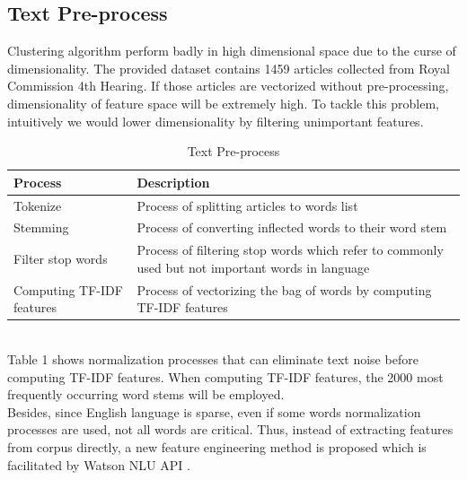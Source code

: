 \documentclass[12pt]{article}
\begin{document}
\subsection{Text Pre-process}
Clustering algorithm perform badly in high dimensional space due to the curse of dimensionality. The provided dataset contains 1459 articles collected from Royal Commission 4th Hearing. If those articles are vectorized without pre-processing, dimensionality of feature space will be extremely high. To tackle this problem, intuitively we would lower dimensionality by filtering unimportant features. 
\begin{table}[h]
\centering
    \begin{tabular}{ | p{4cm}<{\centering} | p{8cm}<{\centering}|}
    \hline
    \textbf{Process}           & \textbf{Description}                                                                             \\ \hline  
    Tokenize          & Process of splitting  articles to words list                                                     \\ \hline  
    Stemming          & Process of converting inflected words to their word stem                                         \\  \hline  
    Filter stop words & Process of filtering stop words which refer to commonly used but not important words in language \\   \hline  
    Computing TF-IDF features  & Process of vectorizing the bag of words by computing TF-IDF features                         \\  \hline
    \end{tabular}
    \caption {Text Pre-process}
\end{table} \\
Table 1 shows normalization processes that can eliminate text noise before computing TF-IDF features. When computing TF-IDF features, the 2000 most frequently occurring word stems will be employed.  \\
Besides, since English language is sparse, even if some words normalization processes are used, not all words are critical. Thus, instead of extracting features from corpus directly, a new feature engineering method is proposed which is facilitated by Watson NLU API . \\
\end{document}
